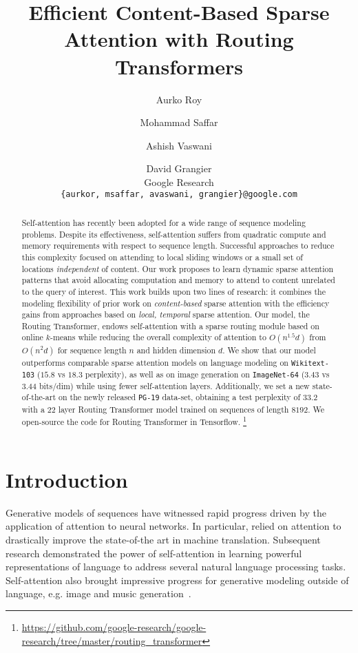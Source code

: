 \documentclass[a4paper]{article}
\title{Efficient Content-Based Sparse Attention with Routing Transformers}
\author{Aurko Roy \and Mohammad Saffar \and Ashish Vaswani \and David Grangier \\
Google Research\\ \texttt{\{aurkor, msaffar, avaswani, grangier\}@google.com} }
\begin{document}
\maketitle
\begin{abstract}
Self-attention has recently been adopted for a wide range of sequence modeling problems.
Despite its effectiveness, self-attention suffers from quadratic compute and memory requirements with respect to sequence length. Successful approaches to reduce this complexity focused on attending to local sliding windows or a small set of locations \emph{independent} of content. 
Our work proposes to learn dynamic sparse attention patterns that avoid allocating 
computation and memory to attend to content unrelated to the query of interest.
This work builds upon two lines of research: it combines the modeling flexibility of 
prior work on \emph{content-based} sparse attention with the efficiency gains from 
approaches based on \emph{local, temporal} sparse attention. Our model, the Routing 
Transformer, endows self-attention with a sparse routing module based on online \(k\)-means
while reducing the overall complexity of attention to \(O(n^{1.5}d)\) from \(O(n^2d)\)
for sequence length \(n\) and hidden dimension \(d\).
We show that our model outperforms comparable sparse attention models
on language modeling on \texttt{Wikitext-103} ($15.8$ vs $18.3$ perplexity),
as well as on image generation on \texttt{ImageNet-64} ($3.43$ vs $3.44$ bits/dim)
while using fewer self-attention layers. Additionally, we set a new state-of-the-art 
on the newly released \texttt{PG-19} data-set, obtaining a test perplexity of 
\(33.2\) with a \(22\) layer Routing Transformer model trained on sequences of length \(8192\). We open-source the code for Routing Transformer in Tensorflow.
\footnote[1]{\url{https://github.com/google-research/google-research/tree/master/routing_transformer}}
\end{abstract}

\section{Introduction}

Generative models of sequences have witnessed rapid progress
driven by the application of attention to neural networks. In 
particular, \citet{bahdanau2014neural,cho2014learning,vaswani2017attention}
relied on attention to drastically improve the state-of-the art
in machine translation. Subsequent research
\citep{radford2018improving,devlin2018bert,liu2019multi, yang2019xlnet}
demonstrated the power of self-attention in learning powerful 
representations of language to address several natural language
processing tasks.
Self-attention also brought impressive progress for generative modeling 
outside of language, e.g. image \citep{parmar2018image, menick2018generating, child2019generating} and
music generation~\citep{huang2018music, child2019generating}.
\end{document}
